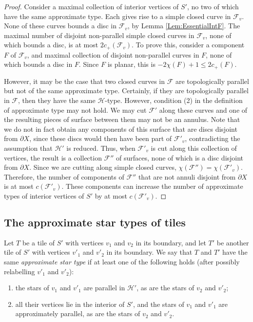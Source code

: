 \documentclass[oneside]{amsart}
\numberwithin{equation}{section}
\theoremstyle{plain}
\theoremstyle{definition}
\begin{document}
\begin{proof}
Consider a maximal collection of interior vertices of $S'$, no two of
which have the same approximate type. Each gives rise to a simple closed curve in $\mathcal{F}_v$.
None of these curves bounds a disc in $\mathcal{F}_v$, by Lemma \ref{Lem:EssentialIntF}.
The maximal number of disjoint non-parallel simple closed curves in $\mathcal{F}_v$, none of which
bounds a disc, is at most $2c_+(\mathcal{F}_v)$. To prove this, consider a component $F$ of $\mathcal{F}_v$,
and maximal collection of disjoint non-parallel
curves in $F$, none of which bounds a disc in $F$. Since $F$ is planar, this
is $-2 \chi(F) + 1 \leq 2 c_+(F)$. 

However, it may be the case that two closed curves in $\mathcal{F}$ are topologically
parallel but not of the same approximate type. Certainly, if they are topologically parallel in
$\mathcal{F}$, then they have the same $\mathcal{H}$-type. However, condition (2) in the
definition of approximate type may not hold. We may cut $\mathcal{F}'$ along these curves
and one of the resulting pieces of surface between them may not be an annulus.
Note that we do not in fact obtain any components of this surface that are discs disjoint from $\partial X$, since these
discs would then have been part of $\mathcal{F}'_v$, contradicting the assumption
that $\mathcal{H}'$ is reduced. Thus, when $\mathcal{F}'_v$ is cut along this collection of vertices,
the result is a collection $\mathcal{F}''$ of surfaces, none of which is a disc disjoint
from $\partial X$. Since we are cutting along simple closed curves, $\chi(\mathcal{F}'')
= \chi(\mathcal{F}'_v)$. Therefore, the number of components of $\mathcal{F}''$
that are not annuli disjoint from $\partial X$ is at most $c(\mathcal{F}'_v)$.
These components can increase the number of approximate types of interior
vertices of $S'$ by at most $c(\mathcal{F}'_v)$.
\end{proof}


\subsection{The approximate star types of tiles}
Let $T$ be a tile of $S'$ with vertices $v_1$ and $v_2$ in its boundary, and let $T'$ be another tile of $S'$ with vertices $v'_1$ and $v'_2$ in its boundary.
We say that $T$ and $T'$ have the same \emph{approximate star type} if at least one of the following holds (after possibly relabelling $v'_1$ and $v'_2$):
\begin{enumerate}
\item the stars of $v_1$ and $v'_1$ are parallel in $\mathcal{H}'$, as are the stars of $v_2$ and $v'_2$;
\item all their vertices lie in the interior of $S'$, and the stars of $v_1$ and $v'_1$ are approximately parallel, as are the stars of $v_2$ and $v'_2$.
\end{enumerate}
\end{document}
